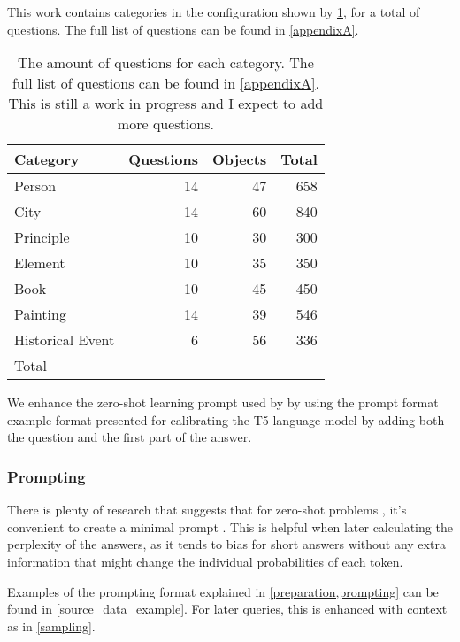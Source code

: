 This work contains \cats{} categories in the configuration shown by \cref{categories_numbers}, for a total of \qs{} questions.
The full list of questions can be found in \cref{appendixA}.

\begin{table}[h]
	\centering
	\scriptsize
	\begin{tabular}{l | r r r}
		\toprule
			\bfseries Category & \bfseries Questions & \bfseries Objects & \bfseries Total \\
		\midrule
			Person           & 14 &  47 &  658 \\
			City             & 14 &  60 &  840 \\
			Principle        & 10 &  30 &  300 \\
			Element          & 10 &  35 &  350 \\
			Book             & 10 &  45 &  450 \\
			Painting         & 14 &  39 &  546 \\
			Historical Event & 6  &  56 &  336 \\
		\midrule
			Total & \baseqs{} & \things{} & \qs{} \\
		\bottomrule
	\end{tabular}
	\caption{The amount of questions for each category. The full list of questions can be found in \cref{appendixA}. This is still a work in progress and I expect to add more questions.}
	\label{categories_numbers}
\end{table}

We enhance the zero-shot learning prompt used by \citeauthor{fewshotlearners} by using the prompt format example format presented \citeauthor{how_can_we_know} for calibrating the T5 language model by adding both the question and the first part of the answer.

\subsubsection{Prompting}
\label{prompting}

There is plenty of research that suggests that for zero-shot problems \citep{fewshotlearners,beyondfewshot}, it's convenient to create a minimal prompt \citep{how_can_we_know,factual_recall}.
This is helpful when later calculating the perplexity of the answers, as it tends to bias for short answers without any extra information that might change the individual probabilities of each token.

Examples of the prompting format explained in \cref{preparation,prompting} can be found in \cref{source_data_example}.
For later queries, this is enhanced with context as in \cref{sampling}.

